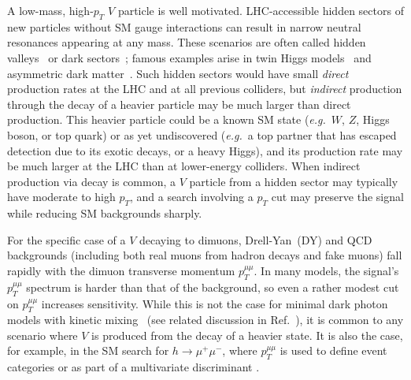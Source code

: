 \documentclass[aps,prd,twocolumn,superscriptaddress,preprintnumbers,nofootinbib,longbibliography,floatfix]{revtex4-1}
\newcommand{\ptmm}{p_T^{\mu\mu}}
\DeclareRobustCommand{\Ref}[1]{Ref.~\cite{#1}}
\begin{document}
A low-mass, high-$p_T$ $V$ particle is well motivated.
%
LHC-accessible hidden sectors of new particles without SM gauge interactions can result in narrow neutral resonances appearing at any mass.
%
These scenarios are often called hidden valleys~\cite{Strassler:2006im} or dark sectors~\cite{Essig:2013lka,Alexander:2016aln}; famous examples arise in  twin Higgs models~\cite{Chacko:2005pe} and asymmetric dark matter~\cite{Nussinov:1985xr,Kaplan:2009ag}. 
%
Such hidden sectors would have small {\it direct} production rates at the LHC and at all previous colliders, but {\it indirect} production through the decay of a heavier particle may be much larger than direct production.
%
This heavier particle could be a known SM state ({\it e.g.}\ $W$, $Z$, Higgs boson, or top quark) or as yet undiscovered ({\it e.g.}\ a top partner that has escaped detection due to its exotic decays, or a heavy Higgs), and its production rate may be much larger at the LHC than at lower-energy colliders.
%
When indirect production via decay is common, a $V$ particle from a hidden sector may typically have moderate to high $p_T$, and a search involving a $p_T$ cut may preserve the signal while reducing SM backgrounds sharply.


For the specific case of a $V$ decaying to dimuons, Drell-Yan~(DY) and QCD backgrounds (including both real muons from hadron decays and fake muons) fall rapidly with the dimuon transverse momentum $\ptmm$.
%
In many models, the signal's $\ptmm$ spectrum is harder than that of the background, so even a rather modest cut on $\ptmm$ increases sensitivity.
%
While this is not the case for minimal dark photon models with kinetic mixing~\cite{Okun:1982xi,Galison:1983pa,Holdom:1985ag,Pospelov:2007mp,ArkaniHamed:2008qn,Bjorken:2009mm} (see related discussion in \Ref{Hoenig:2014dsa}), it is common to any scenario where $V$ is produced from the decay of a heavier state.
%
It is also the case, for example, in the SM search for $h \to \mu^+ \mu^-$, where $\ptmm$ is used to define event categories \cite{Aaboud:2017ojs} or as part of a multivariate discriminant \cite{Sirunyan:2018hbu}.

  
\end{document}
